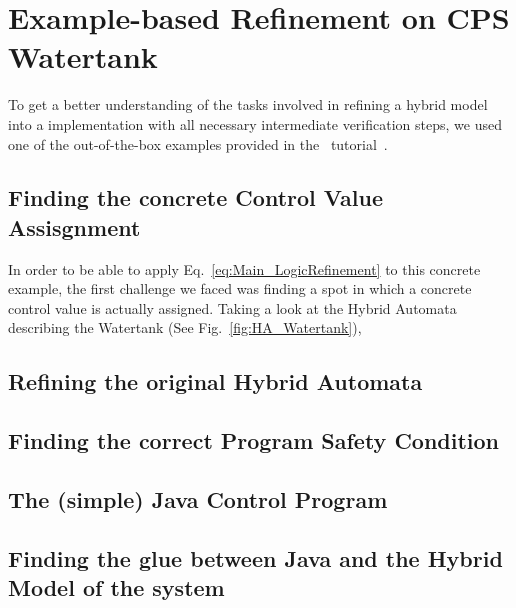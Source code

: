 


\chapter{Example-based Refinement on CPS Watertank}
\label{ch:Watertank}

To get a better understanding of the tasks involved in refining a hybrid model into a implementation with all necessary intermediate verification steps, we used one of the out-of-the-box examples provided in the \keym~tutorial~\cite{keYmaera}.

\section{Finding the concrete Control Value Assisgnment}
\label{sec:Watertank:ControlValue}

In order to be able to apply Eq.~\ref{eq:Main_LogicRefinement} to this concrete example, the first challenge we faced was finding a spot in which a concrete control value is actually assigned. Taking a look at the Hybrid Automata describing the Watertank (See Fig.~\ref{fig:HA_Watertank}), 
\section{Refining the original Hybrid Automata}
\label{sec:Watertank:Refinining}

\section{Finding the correct Program Safety Condition}
\label{sec:Watertank:SafetyCond}

\section{The (simple) Java Control Program}
\label{sec:Watertank:Java}

\section{Finding the glue between Java and the Hybrid Model of the system}
\label{sec:Watertank:Glue}

